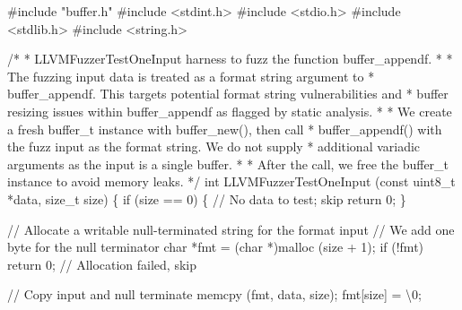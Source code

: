 \documentclass[
  a4paper,
]{scrreprt}
\newenvironment{Shaded}{\begin{snugshade}}{\end{snugshade}}
\newcommand{\CharTok}[1]{\textcolor[rgb]{0.00,0.50,0.00}{#1}}
\newcommand{\CommentTok}[1]{\textcolor[rgb]{0.41,0.41,0.41}{#1}}
\newcommand{\ControlFlowTok}[1]{\textcolor[rgb]{0.85,0.12,0.09}{#1}}
\newcommand{\DataTypeTok}[1]{\textcolor[rgb]{0.47,0.16,0.63}{#1}}
\newcommand{\DecValTok}[1]{\textcolor[rgb]{0.47,0.16,0.63}{#1}}
\newcommand{\ImportTok}[1]{\textcolor[rgb]{0.33,0.33,0.33}{#1}}
\newcommand{\NormalTok}[1]{\textcolor[rgb]{0.33,0.33,0.33}{#1}}
\newcommand{\OperatorTok}[1]{\textcolor[rgb]{0.00,0.46,0.62}{#1}}
\newcommand{\PreprocessorTok}[1]{\textcolor[rgb]{0.47,0.16,0.63}{#1}}
\newcommand{\SpecialCharTok}[1]{\textcolor[rgb]{0.00,0.46,0.62}{#1}}
\theoremstyle{definition}
\theoremstyle{remark}
\begin{document}
\begin{Shaded}
\begin{Highlighting}[numbers=left,,]
\PreprocessorTok{\#include }\ImportTok{"buffer.h"}
\PreprocessorTok{\#include }\ImportTok{\textless{}stdint.h\textgreater{}}
\PreprocessorTok{\#include }\ImportTok{\textless{}stdio.h\textgreater{}}
\PreprocessorTok{\#include }\ImportTok{\textless{}stdlib.h\textgreater{}}
\PreprocessorTok{\#include }\ImportTok{\textless{}string.h\textgreater{}}

\CommentTok{/*}
\CommentTok{ * LLVMFuzzerTestOneInput harness to fuzz the function buffer\_appendf.}
\CommentTok{ *}
\CommentTok{ * The fuzzing input data is treated as a format string argument to}
\CommentTok{ * buffer\_appendf. This targets potential format string vulnerabilities and}
\CommentTok{ * buffer resizing issues within buffer\_appendf as flagged by static analysis.}
\CommentTok{ *}
\CommentTok{ * We create a fresh buffer\_t instance with buffer\_new(), then call}
\CommentTok{ * buffer\_appendf() with the fuzz input as the format string. We do not supply}
\CommentTok{ * additional variadic arguments as the input is a single buffer.}
\CommentTok{ *}
\CommentTok{ * After the call, we free the buffer\_t instance to avoid memory leaks.}
\CommentTok{ */}
\DataTypeTok{int}
\NormalTok{LLVMFuzzerTestOneInput }\OperatorTok{(}\DataTypeTok{const} \DataTypeTok{uint8\_t} \OperatorTok{*}\NormalTok{data}\OperatorTok{,} \DataTypeTok{size\_t}\NormalTok{ size}\OperatorTok{)}
\OperatorTok{\{}
  \ControlFlowTok{if} \OperatorTok{(}\NormalTok{size }\OperatorTok{==} \DecValTok{0}\OperatorTok{)}
    \OperatorTok{\{}
      \CommentTok{// No data to test; skip}
      \ControlFlowTok{return} \DecValTok{0}\OperatorTok{;}
    \OperatorTok{\}}

  \CommentTok{// Allocate a writable null{-}terminated string for the format input}
  \CommentTok{// We add one byte for the null terminator}
  \DataTypeTok{char} \OperatorTok{*}\NormalTok{fmt }\OperatorTok{=} \OperatorTok{(}\DataTypeTok{char} \OperatorTok{*)}\NormalTok{malloc }\OperatorTok{(}\NormalTok{size }\OperatorTok{+} \DecValTok{1}\OperatorTok{);}
  \ControlFlowTok{if} \OperatorTok{(!}\NormalTok{fmt}\OperatorTok{)}
    \ControlFlowTok{return} \DecValTok{0}\OperatorTok{;} \CommentTok{// Allocation failed, skip}

  \CommentTok{// Copy input and null terminate}
\NormalTok{  memcpy }\OperatorTok{(}\NormalTok{fmt}\OperatorTok{,}\NormalTok{ data}\OperatorTok{,}\NormalTok{ size}\OperatorTok{);}
\NormalTok{  fmt}\OperatorTok{[}\NormalTok{size}\OperatorTok{]} \OperatorTok{=} \CharTok{\textquotesingle{}}\SpecialCharTok{\textbackslash{}0}\CharTok{\textquotesingle{}}\OperatorTok{;}


\end{Highlighting}
\end{Shaded}
\end{document}
